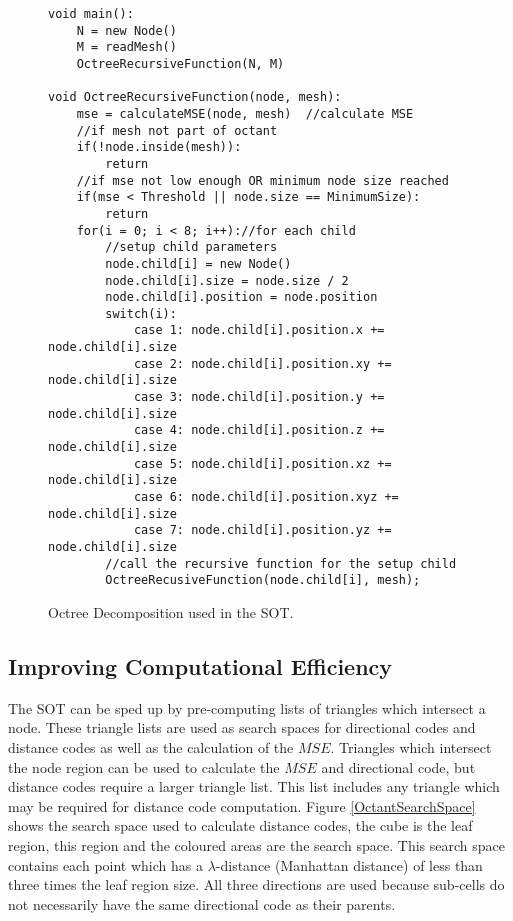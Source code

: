 \begin{figure}[!h]
\lstset{language=c++}
\begin{lstlisting}
void main():
	N = new Node() 
	M = readMesh()
	OctreeRecursiveFunction(N, M)
	
void OctreeRecursiveFunction(node, mesh):
	mse = calculateMSE(node, mesh)	//calculate MSE
	//if mesh not part of octant
	if(!node.inside(mesh)):
		return
	//if mse not low enough OR minimum node size reached
	if(mse < Threshold || node.size == MinimumSize):
		return
	for(i = 0; i < 8; i++)://for each child
		//setup child parameters
		node.child[i] = new Node()
		node.child[i].size = node.size / 2
		node.child[i].position = node.position
		switch(i):
			case 1: node.child[i].position.x += node.child[i].size
			case 2: node.child[i].position.xy += node.child[i].size
			case 3: node.child[i].position.y += node.child[i].size
			case 4: node.child[i].position.z += node.child[i].size
			case 5: node.child[i].position.xz += node.child[i].size
			case 6: node.child[i].position.xyz += node.child[i].size
			case 7: node.child[i].position.yz += node.child[i].size
		//call the recursive function for the setup child
		OctreeRecusiveFunction(node.child[i], mesh);

\end{lstlisting}
\label{OctreeDecompositionAlgorithm}
\caption{Octree Decomposition used in the SOT.}
\end{figure}

\subsection{Improving Computational Efficiency}

The SOT can be sped up by pre-computing lists of triangles which intersect a node. These triangle lists are used as search spaces for directional codes and distance codes as well as the calculation of the $MSE$. Triangles which intersect the node region can be used to calculate the $MSE$ and directional code, but distance codes require a larger triangle list. This list includes any triangle which may be required for distance code computation. Figure \ref{OctantSearchSpace} shows the search space used to calculate distance codes, the cube is the leaf region, this region and the coloured areas are the search space. This search space contains each point which has a $\lambda$-distance (Manhattan distance) of less than three times the leaf region size. All three directions are used because sub-cells do not necessarily have the same directional code as their parents.

